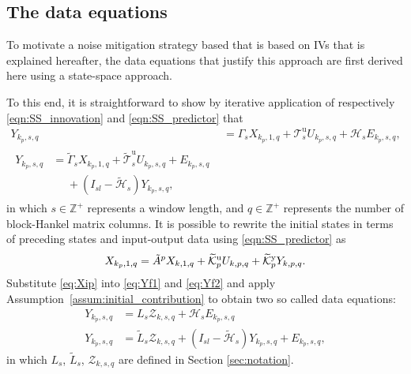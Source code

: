 \subsection{The data equations}\label{sec:DerivingDataEquations}
To motivate a noise mitigation strategy based that is based on \ac{IVs} that is explained hereafter, the data equations that justify this approach are first derived here using a state-space approach.

To this end, it is straightforward to show by iterative application of respectively \eqref{eqn:SS_innovation} and \eqref{eqn:SS_predictor} that%
\begin{align}
    Y_{k_p,s,q} &= \Gamma_s X_{k_p,1,q} + \mathcal{T}_s^\mathrm{u} U_{k_p,s,q} + \mathcal{H}_s E_{k_p,s,q}\label{eq:Yf1},\\
    \begin{split}%
    Y_{k_p,s,q} &= \widetilde{\Gamma}_s X_{k_p,1,q} + \widetilde{\mathcal{T}}_s^\mathrm{u} U_{k_p,s,q} + E_{k_p,s,q}\\
    &\phantom{=}+(I_{sl}-\widetilde{\mathcal{H}}_s)Y_{k_p,s,q},
    \end{split}\label{eq:Yf2}
\end{align}
in which $s\in\mathbb{Z}^+$ represents a window length, and $q\in\mathbb{Z}^+$ represents the number of block-Hankel matrix columns. It is possible to rewrite the initial states in terms of preceding states and input-output data using \eqref{eqn:SS_predictor} as%
\begin{align}\label{eq:Xip}
    X_{k_p,1,q} = \tilde{A}^p X_{k,1,q} + \widetilde{\mathcal{K}}_{p}^{\mathrm{{u}}} U_{k,p,q} + \widetilde{\mathcal{K}}_{p}^{\mathrm{{y}}} Y_{k,p,q}.
\end{align}
Substitute \eqref{eq:Xip} into \eqref{eq:Yf1} and \eqref{eq:Yf2} and apply Assumption~\ref{assum:initial_contribution} to obtain two so called data equations:
\begin{align}
    Y_{k_p,s,q} &= L_s \mathcal{Z}_{k,s,q} + \mathcal{H}_s E_{k_p,s,q}\label{eq:DataEq1}\\
    Y_{k_p,s,q} &= \widetilde{L}_s \mathcal{Z}_{k,s,q} + (I_{sl}-\widetilde{\mathcal{H}}_s) Y_{k_p,s,q} + E_{k_p,s,q},\label{eq:DataEq2}
\end{align}
in which $L_s$, $\widetilde{L}_s$, $\mathcal{Z}_{k,s,q}$ are defined in Section \ref{sec:notation}. %
